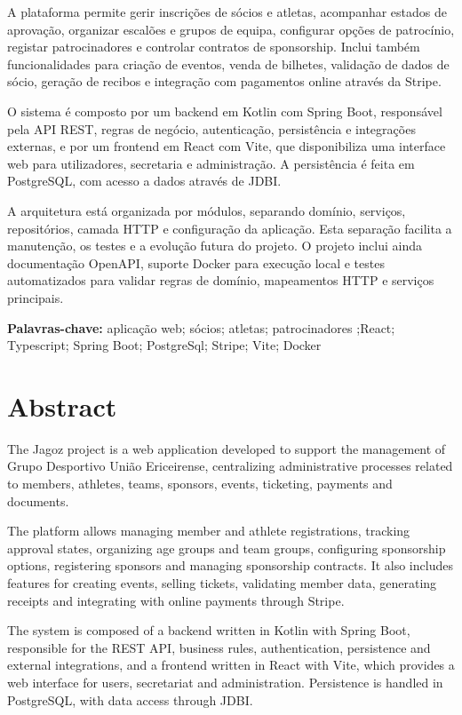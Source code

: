 \documentclass[a4paper,openright,twoside,11pt]{report}
\begin{document}
A plataforma permite gerir inscrições de sócios e atletas, acompanhar estados de aprovação, organizar escalões e grupos de equipa, configurar opções de patrocínio, registar patrocinadores e controlar contratos de sponsorship. Inclui também funcionalidades para criação de eventos, venda de bilhetes, validação de dados de sócio, geração de recibos e integração com pagamentos online através da Stripe.

O sistema é composto por um backend em Kotlin com Spring Boot, responsável pela API REST, regras de negócio, autenticação, persistência e integrações externas, e por um frontend em React com Vite, que disponibiliza uma interface web para utilizadores, secretaria e administração. A persistência é feita em PostgreSQL, com acesso a dados através de JDBI.

A arquitetura está organizada por módulos, separando domínio, serviços, repositórios, camada HTTP e configuração da aplicação. Esta separação facilita a manutenção, os testes e a evolução futura do projeto. O projeto inclui ainda documentação OpenAPI, suporte Docker para execução local e testes automatizados para validar regras de domínio, mapeamentos HTTP e serviços principais.

\textbf{Palavras-chave:} aplicação web; sócios; atletas; patrocinadores ;React; Typescript; Spring Boot; PostgreSql; Stripe; Vite; Docker  %

\cleardoublepage
\chapter*{Abstract}

The Jagoz project is a web application developed to support the management of 
Grupo Desportivo União Ericeirense, centralizing administrative processes 
related to members, athletes, teams, sponsors, events, ticketing, payments and 
documents.

The platform allows managing member and athlete registrations, tracking 
approval states, organizing age groups and team groups, configuring sponsorship 
options, registering sponsors and managing sponsorship contracts. It also 
includes features for creating events, selling tickets, validating member data, 
generating receipts and integrating with online payments through Stripe.

The system is composed of a backend written in Kotlin with Spring Boot, 
responsible for the REST API, business rules, authentication, persistence and 
external integrations, and a frontend written in React with Vite, which 
provides a web interface for users, secretariat and administration. Persistence 
is handled in PostgreSQL, with data access through JDBI.
\end{document}
